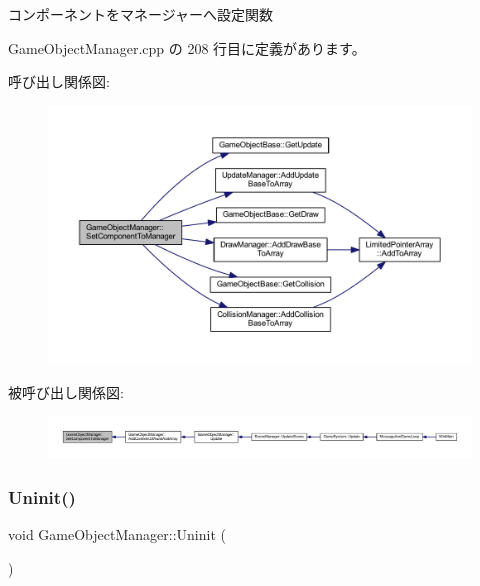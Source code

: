 コンポーネントをマネージャーへ設定関数 



 Game\+Object\+Manager.\+cpp の 208 行目に定義があります。

呼び出し関係図\+:
\nopagebreak
\begin{figure}[H]
\begin{center}
\leavevmode
\includegraphics[width=350pt]{class_game_object_manager_a4c6cdb6d0a1f43a2e2e705677fa2f5f6_cgraph}
\end{center}
\end{figure}
被呼び出し関係図\+:
\nopagebreak
\begin{figure}[H]
\begin{center}
\leavevmode
\includegraphics[width=350pt]{class_game_object_manager_a4c6cdb6d0a1f43a2e2e705677fa2f5f6_icgraph}
\end{center}
\end{figure}
\mbox{\label{class_game_object_manager_a4d2cb0e07fddeea160e64f6e1d2a326a}} 
\subsubsection{\texorpdfstring{Uninit()}{Uninit()}}
{\footnotesize\ttfamily void Game\+Object\+Manager\+::\+Uninit (\begin{DoxyParamCaption}{ }\end{DoxyParamCaption})\hspace{0.3cm}{\ttfamily [static]}}



